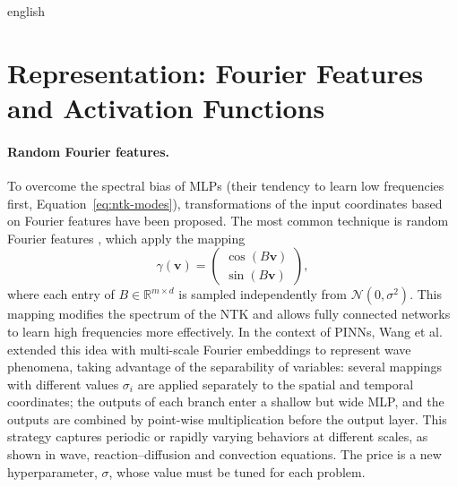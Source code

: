 \documentclass[../0000.tex]{subfiles}
\begin{document}
\begin{hyphenrules}{english}
\section{Representation: Fourier Features and Activation Functions}\label{sec:representation}

\paragraph{Random Fourier features.}
To overcome the spectral bias of MLPs (their tendency to learn low frequencies first,
Equation~\eqref{eq:ntk-modes}), transformations of the input coordinates based on Fourier features have been
proposed. The most common technique is random Fourier features \cite{tancik2020}, which apply the
mapping
\begin{equation}
  \gamma(\mathbf{v})=\begin{pmatrix}\cos(B\mathbf{v})\\ \sin(B\mathbf{v})\end{pmatrix},
  \label{eq:fourier-features}
\end{equation}
where each entry of $B\in\mathbb{R}^{m\times d}$ is sampled independently from $\mathcal{N}(0,\sigma^2)$. This mapping
modifies the spectrum of the NTK and allows fully connected networks to learn high frequencies more
effectively. In the context of PINNs, Wang et al.~\cite{wang2021eigenvector} extended this idea with multi-scale
Fourier embeddings to represent wave phenomena, taking advantage of the separability of variables: several
mappings with different values $\sigma_i$ are applied separately to the spatial and temporal coordinates;
the outputs of each branch enter a shallow but wide MLP, and the outputs are combined by point-wise
multiplication before the output layer. This strategy captures periodic or rapidly varying behaviors at
different scales, as shown in wave, reaction--diffusion and convection equations. The price is a new
hyperparameter, $\sigma$, whose value must be tuned for each problem.


\end{hyphenrules}
\end{document}
